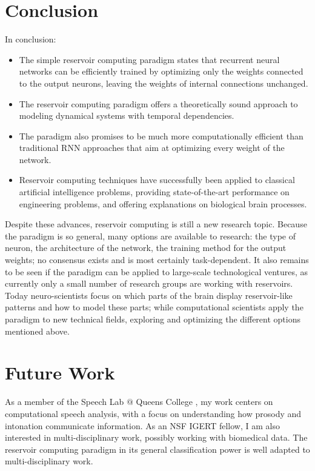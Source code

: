 \documentclass[12pt,oneside]{CUNY_CS_PhD}
\begin{document}
\section{Conclusion}
In conclusion:
\begin{itemize}[noitemsep]
\item The simple reservoir computing paradigm states that recurrent neural networks can be efficiently trained by optimizing only the weights connected to the output neurons, leaving the weights of internal connections unchanged. 
\item The reservoir computing paradigm offers a theoretically sound approach to modeling dynamical systems with temporal dependencies. 
\item The paradigm also promises to be much more computationally efficient than traditional RNN approaches that aim at optimizing every weight of the network.
\item Reservoir computing techniques have successfully been applied to classical artificial intelligence problems, providing state-of-the-art performance on engineering problems, and offering explanations on biological brain processes.
\end{itemize}

Despite these advances, reservoir computing is still a new research topic. Because the paradigm is so general, many options are available to research: the type of neuron, the architecture of the network, the training method for the output weights; no consensus exists and is most certainly task-dependent. It also remains to be seen if the paradigm can be applied to large-scale technological ventures, as currently only a small number of research groups are working with reservoirs. Today neuro-scientists focus on which parts of the brain display reservoir-like patterns and how to model these parts; while computational scientists apply the paradigm to new technical fields, exploring and optimizing the different options mentioned above. 


\section{Future Work}
As a member of the Speech Lab $@$ Queens College \cite{slqc}, my work centers on computational speech analysis, with a focus on understanding how prosody and intonation communicate information. As an NSF IGERT \cite{igert} fellow, I am also interested in multi-disciplinary work, possibly working with biomedical data. The reservoir computing paradigm in its general classification power is well adapted to multi-disciplinary work.
\end{document}
